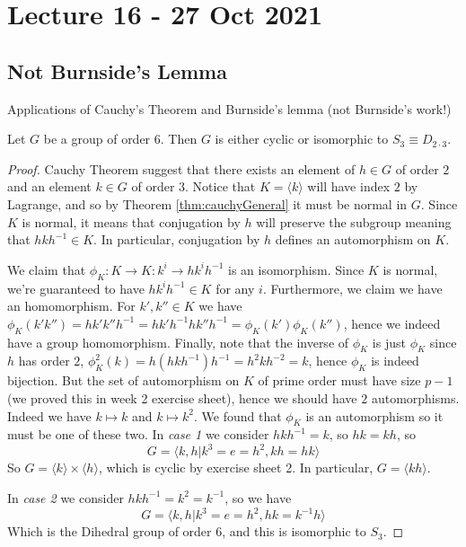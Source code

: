 \section{Lecture 16 - 27 Oct 2021}
\subsection{Not Burnside's Lemma}
Applications of Cauchy's Theorem and Burnside's lemma (not Burnside's work!)
\begin{example} 
  Let $G$ be a group of order $6$. Then $G$ is either cyclic or isomorphic to $S_3\equiv
  D_{2\cdot 3}$.
\end{example}
\begin{proof}
  Cauchy Theorem suggest that there exists an element of $h\in G$ of order $2$ and an
  element $k\in G$ of order $3$. Notice that $K=\langle k \rangle$ will have index $2$ by
  Lagrange, and so by Theorem \ref{thm:cauchyGeneral} it must be normal in $G$. Since $K$
  is normal, it means that conjugation by $h$ will preserve the subgroup meaning that
  $hkh^{-1}\in K$. In particular, conjugation by $h$ defines an automorphism on $K$. 

  We claim that $\phi_K:K\to K: k^i\to hk^ih^{-1}$ is an isomorphism. Since $K$ is normal,
  we're guaranteed to have $hk^ih^{-1}\in K$ for any $i$. Furthermore, we claim we have an
  homomorphism. For $k',k''\in K$ we have $\phi_K(k'k'')=hk'k''h^{-1}=
  hk'h^{-1}hk''h^{-1}=\phi_K(k')\phi_K(k'')$, hence we indeed have a group homomorphism.
  Finally, note that the inverse of $\phi_K$ is just $\phi_K$ since $h$ has order $2$,
  $\phi_K^2(k)=h(hkh^{-1})h^{-1}= h^2 k h^{-2} = k$, hence $\phi_K$ is indeed bijection. But
  the set of automorphism on $K$ of prime order must have size $p-1$ (we proved this in week
  2 exercise sheet), hence we should have $2$ automorphisms. Indeed we have $k\mapsto k$ and
  $k\mapsto k^2$. We found that $\phi_K$ is an automorphism so it must be one of these two.
  In \emph{case 1} we consider $hkh^{-1}=k$, so $hk=kh$, so 
  \[G=\langle k,h | k^3=e=h^2, kh=hk \rangle\]
  So $G=\langle k \rangle \times \langle h \rangle$, which is cyclic by exercise sheet 2.
  In particular, $G=\langle kh \rangle$.

  In \emph{case 2} we consider $hkh^{-1}=k^{2}=k^{-1}$, so we have
  \[G=\langle k,h | k^3=e=h^2, hk=k^{-1}h\rangle\]
  Which is the Dihedral group of order $6$, and this is isomorphic to $S_3$. 
\end{proof}

